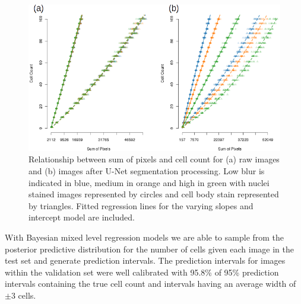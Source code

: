 \documentclass[isoft]{poster_class_UofC}
\begin{document}
\begin{poster}
             \vspace{1cm}
           \begin{figure}
            \centering
            \captionsetup{type=figure}
            \includegraphics[scale=1.7]{./images/rawVUnet.png}
            \caption{Relationship between sum of pixels and cell count for (a) raw images and (b) images after U-Net segmentation processing. Low blur is indicated in blue, medium in orange and high in green with nuclei stained images represented by circles and cell body stain represented by triangles. Fitted regression lines for the varying slopes and intercept model are included.}
            \label{fig:Results}
        \end{figure}   
            \vspace{1cm}
With Bayesian mixed level regression models we are able to sample from the posterior predictive distribution for the number of cells given each image in the test set and generate prediction intervals. The prediction intervals for images within the validation set were well calibrated with 95.8\% of 95\% prediction intervals containing the true cell count and intervals having an average width of $\pm 3$ cells.




\end{poster}
\end{document}
